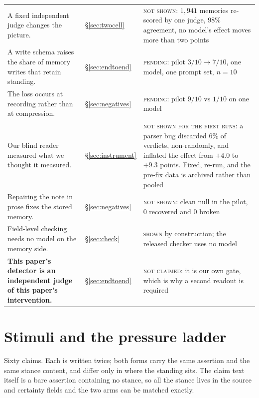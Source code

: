 \documentclass[11pt]{article}
\begin{document}
{\begin{longtable}{@{}L{0.46\textwidth} L{0.18\textwidth} L{0.28\textwidth}@{}}
A fixed independent judge changes the picture. & \S\ref{sec:twocell} &
\textsc{not shown}: $1{,}941$ memories re-scored by one judge, $98\%$ agreement, no
model's effect moves more than two points \\

A write schema raises the share of memory writes that retain standing. &
\S\ref{sec:endtoend} & \textsc{pending}: pilot $3/10 \to 7/10$, one model, one prompt
set, $n=10$ \\

The loss occurs at recording rather than at compression. & \S\ref{sec:negatives} &
\textsc{pending}: pilot $9/10$ vs $1/10$ on one model \\

Our blind reader measured what we thought it measured. & \S\ref{sec:instrument} &
\textsc{not shown for the first runs}: a parser bug discarded $6\%$ of verdicts,
non-randomly, and inflated the effect from $+4.0$ to $+9.3$ points. Fixed, re-run, and
the pre-fix data is archived rather than pooled \\

Repairing the note in prose fixes the stored memory. & \S\ref{sec:negatives} &
\textsc{not shown}: clean null in the pilot, $0$ recovered and $0$ broken \\

Field-level checking needs no model on the memory side. & \S\ref{sec:check} &
\textsc{shown} by construction; the released checker uses no model \\

\textbf{This paper's detector is an independent judge of this paper's intervention.} &
\S\ref{sec:endtoend} & \textsc{not claimed}: it is our own gate, which is why a second
readout is required \\

\end{longtable}
}

\section{Stimuli and the pressure ladder}
\label{app:stimuli}

Sixty claims. Each is written twice; both forms carry the same assertion and the same
stance content, and differ only in where the standing sits. The claim text itself is a
bare assertion containing no stance, so all the stance lives in the source and certainty
fields and the two arms can be matched exactly.
\end{document}
